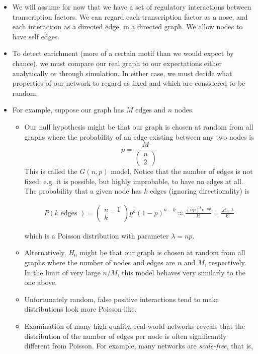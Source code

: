 \documentclass{article}
\begin{document}
\begin{itemize}
\item We will assume for now that we have a set of regulatory interactions between transcription factors. We can regard each transcription factor as a nose, and each interaction as a directed edge, in a directed graph. We allow nodes to have self edges.
\item To detect enrichment (more of a certain motif than we would expect by chance), we must compare our real graph to our expectations either analytically or through simulation. In either case, we must decide what properties of our network to regard as fixed and which are considered to be random.
\item For example, suppose our graph has $M$ edges and $n$ nodes.
\begin{itemize}
\item Our null hypothesis might be that our graph is chosen at random from all graphs where the probability of an edge existing between any two nodes is
\[ p = \frac{M}{\begin{pmatrix} n\\2 \end{pmatrix}} \]
This is called the $G(n,p)$ model. Notice that the number of edges is not fixed: e.g. it is possible, but highly improbable, to have no edges at all. The probability that a given node has $k$ edges (ignoring directionality) is

\begin{eqnarray}
P(k \textrm{ edges }) = \begin{pmatrix} n-1 \\ k\end{pmatrix}  p^k \left(1 - p \right)^{n-k} \approx \frac{\left(np \right)^k e^{-np}}{k!} = \frac{\lambda^k e^{-\lambda}}{k!} \label{eqn:erdosrenyi}
\end{eqnarray}

which is a Poisson distribution with parameter $\lambda=np$.
\item Alternatively, $H_0$ might be that our graph is chosen at random from all graphs where the number of nodes and edges are $n$ and $M$, respectively. In the limit of very large $n$/$M$, this model behaves very similarly to the one above.

\item Unfortunately random, false positive interactions tend to make distributions look more Poisson-like.

\item Examination of many high-quality, real-world networks reveals that the distribution of the number of edges per node is often significantly different from Poisson. For example, many networks are \textit{scale-free}, that is,


\end{itemize}
\end{itemize}
\end{document}
